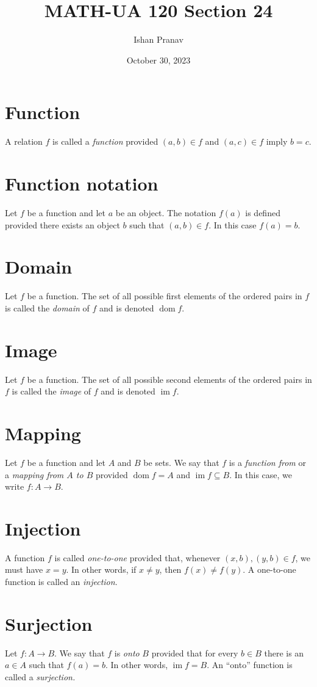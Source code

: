 \documentclass[12pt]{article}
\title{MATH-UA 120 Section 24}
\author{Ishan Pranav}
\date{October 30, 2023}
\DeclareMathOperator{\dom}{dom}
\DeclareMathOperator{\im}{im}
\begin{document}
\maketitle
\section*{Function}
A relation $f$ is called a \textit{function} provided $(a,b)\in f$ and $(a,c)\in f$ imply $b=c$.
\section*{Function notation}
Let $f$ be a function and let $a$ be an object. The notation $f(a)$ is defined provided there exists an object $b$ such that $(a,b)\in f$. In this case $f(a)=b$.
\section*{Domain}
Let $f$ be a function. The set of all possible first elements of the ordered pairs in $f$ is called the \textit{domain} of $f$ and is denoted $\dom{f}$.
\section*{Image}
Let $f$ be a function. The set of all possible second elements of the ordered pairs in $f$ is called the \textit{image} of $f$ and is denoted $\im{f}$.
\section*{Mapping}
Let $f$ be a function and let $A$ and $B$ be sets. We say that $f$ is a \textit{function from} or a \textit{mapping from $A$ to $B$} provided $\dom{f}=A$ and $\im{f}\subseteq B$. In this case, we write $f:A\to B$.
\section*{Injection}
A function $f$ is called \textit{one-to-one} provided that, whenever $(x,b),(y,b)\in f$, we must have $x=y$. In other words, if $x\neq y$, then $f(x)\neq f(y)$. A one-to-one function is called an \textit{injection}.
\section*{Surjection}
Let $f:A\to B$. We say that $f$ is \textit{onto} $B$ provided that for every $b\in B$ there is an $a\in A$ such that $f(a)=b$. In other words, $\im{f}=B$. An ``onto'' function is called a \textit{surjection.}
\end{document}
